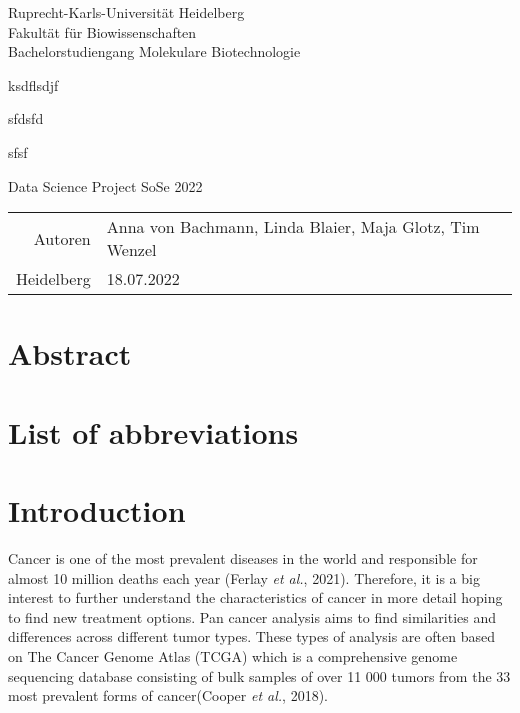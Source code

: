 \documentclass[
  parskip,
  oneside]{scrreprt}
\author{}
\date{\vspace{-2.5em}}
\begin{document}
\begin{titlepage}
\centering
    {\Large Ruprecht-Karls-Universität Heidelberg\\
        Fakultät für Biowissenschaften\\
        Bachelorstudiengang Molekulare Biotechnologie\\}

    {}
    {

        {\Huge ksdflsdjf}

        {\Huge sfdsfd}

        {\Huge sfsf}

    }

    {\Large Data Science Project SoSe 2022}


    {\Large
        \begin{tabular}{rl}
            Autoren & Anna von Bachmann, Linda Blaier, Maja Glotz, Tim Wenzel\\
            Heidelberg &18.07.2022\\
        \end{tabular}
    }


\end{titlepage}

\hypertarget{abstract}{%
\chapter{Abstract}\label{abstract}}

\tableofcontents

\hypertarget{list-of-abbreviations}{%
\chapter{List of abbreviations}\label{list-of-abbreviations}}

\hypertarget{introduction}{%
\chapter{Introduction}\label{introduction}}

Cancer is one of the most prevalent diseases in the world and
responsible for almost 10 million deaths each year (Ferlay \emph{et
al.}, 2021). Therefore, it is a big interest to further understand the
characteristics of cancer in more detail hoping to find new treatment
options. Pan cancer analysis aims to find similarities and differences
across different tumor types. These types of analysis are often based on
The Cancer Genome Atlas (TCGA) which is a comprehensive genome
sequencing database consisting of bulk samples of over 11 000 tumors
from the 33 most prevalent forms of cancer(Cooper \emph{et al.}, 2018).
\end{document}
